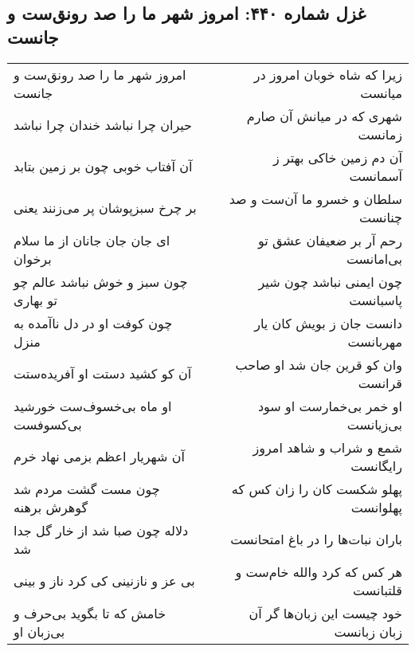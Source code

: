 \begin{center}
\section*{غزل شماره ۴۴۰: امروز شهر ما را صد رونق‌ست و جانست}
\label{sec:0440}
\begin{longtable}{l p{0.5cm} r}
امروز شهر ما را صد رونق‌ست و جانست
&&
زیرا که شاه خوبان امروز در میانست
\\
حیران چرا نباشد خندان چرا نباشد
&&
شهری که در میانش آن صارم زمانست
\\
آن آفتاب خوبی چون بر زمین بتابد
&&
آن دم زمین خاکی بهتر ز آسمانست
\\
بر چرخ سبزپوشان پر می‌زنند یعنی
&&
سلطان و خسرو ما آن‌ست و صد چنانست
\\
ای جان جان جانان از ما سلام برخوان
&&
رحم آر بر ضعیفان عشق تو بی‌امانست
\\
چون سبز و خوش نباشد عالم چو تو بهاری
&&
چون ایمنی نباشد چون شیر پاسبانست
\\
چون کوفت او در دل ناآمده به منزل
&&
دانست جان ز بویش کان یار مهربانست
\\
آن کو کشید دستت او آفریده‌ستت
&&
وان کو قرین جان شد او صاحب قرانست
\\
او ماه بی‌خسوف‌ست خورشید بی‌کسوفست
&&
او خمر بی‌خمارست او سود بی‌زیانست
\\
آن شهریار اعظم بزمی نهاد خرم
&&
شمع و شراب و شاهد امروز رایگانست
\\
چون مست گشت مردم شد گوهرش برهنه
&&
پهلو شکست کان را زان کس که پهلوانست
\\
دلاله چون صبا شد از خار گل جدا شد
&&
باران نبات‌ها را در باغ امتحانست
\\
بی عز و نازنینی کی کرد ناز و بینی
&&
هر کس که کرد والله خام‌ست و قلتبانست
\\
خامش که تا بگوید بی‌حرف و بی‌زبان او
&&
خود چیست این زبان‌ها گر آن زبان زبانست
\\
\end{longtable}
\end{center}
